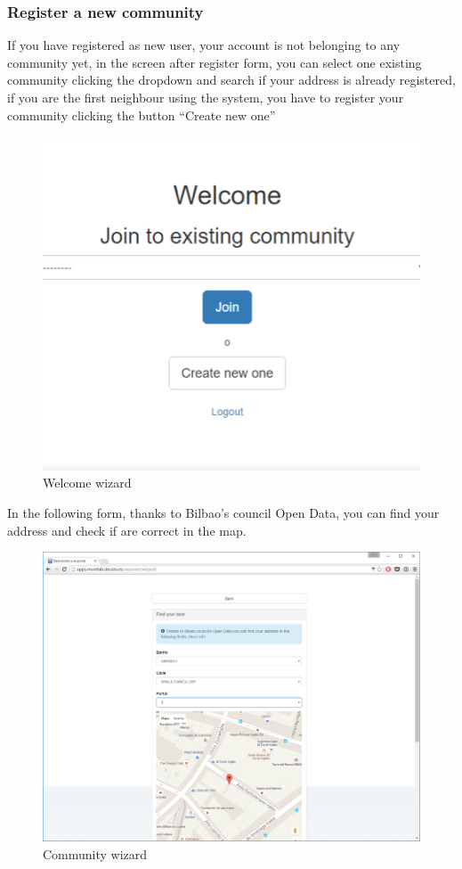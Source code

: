 \documentclass{DeustoFDP}
\begin{document}
\subsubsection{Register a new community}
If you have registered as new user, your account is not belonging to any community yet, in the screen after register form, you can select one existing community clicking the dropdown and search if your address is already registered, if you are the first neighbour using the system, you have to register your community clicking the button “Create new one”
\begin{figure}[h!]
\centering
\includegraphics[width=0.9\linewidth]{fig/Manual/wizard}
\caption[Welcome wizard]{Welcome wizard}
\label{fig:wizard}
\end{figure}

In the following form, thanks to Bilbao’s council Open Data, you can find your address and check if are correct in the map.
\begin{figure}[h!]
\centering
\includegraphics[width=0.9\linewidth]{fig/Manual/address}
\caption[Community wizard]{Community wizard}
\label{fig:address}
\end{figure}
\end{document}

